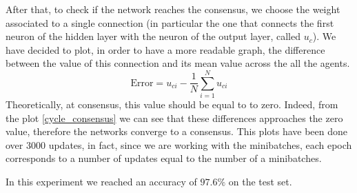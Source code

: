 \documentclass[a4paper,11pt,oneside]{book}
\begin{document}
\bigskip

After that, to check if the network reaches the consensus, we choose the weight associated to a single connection (in particular the one that connects the first neuron of the hidden layer with the neuron of the output layer, called $u_c$). We have decided to plot, in order to have a more readable graph, the difference between the value of this connection and its mean value across the all the agents.
\begin{equation}
\text{Error} = u_{ci} - \frac{1}{N}\sum_{i=1}^N u_{ci}
\end{equation}
Theoretically, at consensus, this value should be equal to to zero. Indeed, from the plot \ref{cycle_consensus} we can see that these differences approaches the zero value, therefore the networks converge to a consensus.  This plots have been done over $3000$ updates, in fact, since we are working with the minibatches, each epoch corresponds to a number of updates equal to the number of a minibatches.

\bigskip
In this experiment we reached an accuracy of $97.6\%$ on the test set.
\end{document}

